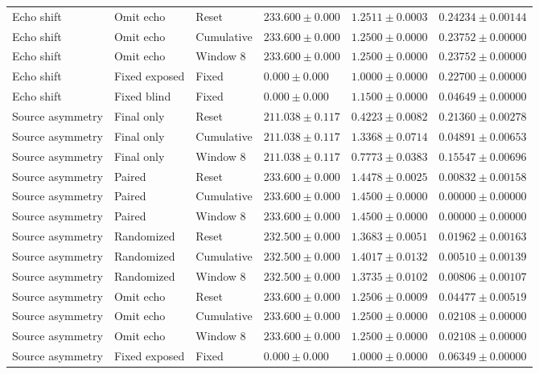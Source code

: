 \begin{longtable}{@{}llllll@{}}
Echo shift & Omit echo & Reset & $233.600 \pm 0.000$ & $1.2511 \pm 0.0003$ & $0.24234 \pm 0.00144$ \\
Echo shift & Omit echo & Cumulative & $233.600 \pm 0.000$ & $1.2500 \pm 0.0000$ & $0.23752 \pm 0.00000$ \\
Echo shift & Omit echo & Window 8 & $233.600 \pm 0.000$ & $1.2500 \pm 0.0000$ & $0.23752 \pm 0.00000$ \\
Echo shift & Fixed exposed & Fixed & $0.000 \pm 0.000$ & $1.0000 \pm 0.0000$ & $0.22700 \pm 0.00000$ \\
Echo shift & Fixed blind & Fixed & $0.000 \pm 0.000$ & $1.1500 \pm 0.0000$ & $0.04649 \pm 0.00000$ \\
Source asymmetry & Final only & Reset & $211.038 \pm 0.117$ & $0.4223 \pm 0.0082$ & $0.21360 \pm 0.00278$ \\
Source asymmetry & Final only & Cumulative & $211.038 \pm 0.117$ & $1.3368 \pm 0.0714$ & $0.04891 \pm 0.00653$ \\
Source asymmetry & Final only & Window 8 & $211.038 \pm 0.117$ & $0.7773 \pm 0.0383$ & $0.15547 \pm 0.00696$ \\
Source asymmetry & Paired & Reset & $233.600 \pm 0.000$ & $1.4478 \pm 0.0025$ & $0.00832 \pm 0.00158$ \\
Source asymmetry & Paired & Cumulative & $233.600 \pm 0.000$ & $1.4500 \pm 0.0000$ & $0.00000 \pm 0.00000$ \\
Source asymmetry & Paired & Window 8 & $233.600 \pm 0.000$ & $1.4500 \pm 0.0000$ & $0.00000 \pm 0.00000$ \\
Source asymmetry & Randomized & Reset & $232.500 \pm 0.000$ & $1.3683 \pm 0.0051$ & $0.01962 \pm 0.00163$ \\
Source asymmetry & Randomized & Cumulative & $232.500 \pm 0.000$ & $1.4017 \pm 0.0132$ & $0.00510 \pm 0.00139$ \\
Source asymmetry & Randomized & Window 8 & $232.500 \pm 0.000$ & $1.3735 \pm 0.0102$ & $0.00806 \pm 0.00107$ \\
Source asymmetry & Omit echo & Reset & $233.600 \pm 0.000$ & $1.2506 \pm 0.0009$ & $0.04477 \pm 0.00519$ \\
Source asymmetry & Omit echo & Cumulative & $233.600 \pm 0.000$ & $1.2500 \pm 0.0000$ & $0.02108 \pm 0.00000$ \\
Source asymmetry & Omit echo & Window 8 & $233.600 \pm 0.000$ & $1.2500 \pm 0.0000$ & $0.02108 \pm 0.00000$ \\
Source asymmetry & Fixed exposed & Fixed & $0.000 \pm 0.000$ & $1.0000 \pm 0.0000$ & $0.06349 \pm 0.00000$ \\

\end{longtable}
